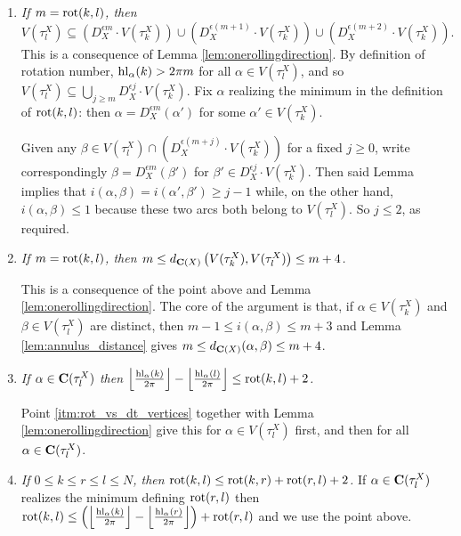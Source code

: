 \begin{rmk}
\begin{enumerate}
\item \label{itm:rot_vs_dt_vertices} \textit{If $m=\mathrm{rot}(k,l)$, then
$$V(\tau_l^X)\subseteq \left(D_X^{\epsilon m}\cdot V(\tau_k^X)\right)\cup \left(D_X^{\epsilon(m+1)}\cdot V(\tau_k^X)\right)\cup \left(D_X^{\epsilon(m+2)}\cdot V(\tau_k^X)\right).$$}
This is a consequence of Lemma \ref{lem:onerollingdirection}. By definition of rotation number, $\mathrm{hl}_\alpha(k)>2\pi m$ for all $\alpha \in V(\tau_l^X)$, and so $V(\tau_l^X)\subseteq \bigcup_{j\geq m} D_X^{\epsilon j}\cdot V(\tau_k^X)$. Fix $\alpha$ realizing the minimum in the definition of $\mathrm{rot}(k,l)$: then $\alpha= D_X^{\epsilon m}(\alpha')$ for some $\alpha'\in V(\tau_k^X)$.

Given any $\beta\in V(\tau_l^X)\cap \left(D_X^{\epsilon(m+j)}\cdot V(\tau_k^X)\right)$ for a fixed $j\geq 0$, write correspondingly $\beta=D_X^{\epsilon m}(\beta')$ for $\beta'\in D_X^{\epsilon j}\cdot V(\tau_k^X)$. Then said Lemma implies that $i(\alpha,\beta)=i(\alpha',\beta')\geq j-1$ while, on the other hand, $i(\alpha,\beta)\leq 1$ because these two arcs both belong to $V(\tau_l^X)$. So $j\leq 2$, as required.

\item \label{itm:rot_vs_dist}\textit{If $m=\mathrm{rot}(k,l)$, then $m\leq d_{\mathbf C(X)}\left(V(\tau_k^X),V(\tau_l^X)\right)\leq m+4$.}

This is a consequence of the point above and Lemma \ref{lem:onerollingdirection}. The core of the argument is that, if $\alpha\in V(\tau_k^X)$ and $\beta\in V(\tau_l^X)$ are distinct, then $m-1\leq i(\alpha,\beta)\leq m+3$ and Lemma \ref{lem:annulus_distance} gives $m\leq d_{\mathbf C(X)}(\alpha,\beta)\leq m+4$. 

\item \textit{If $\alpha\in\mathbf C(\tau_l^X)$ then $\left\lfloor \frac{\mathrm{hl}_\alpha(k)}{2\pi}\right\rfloor-\left\lfloor \frac{\mathrm{hl}_\alpha(l)}{2\pi}\right\rfloor\leq  \mathrm{rot}(k,l)+2$.}

Point \ref{itm:rot_vs_dt_vertices} together with Lemma \ref{lem:onerollingdirection} give this for $\alpha\in V(\tau_l^X)$ first, and then for all $\alpha\in\mathbf C(\tau_l^X)$.

\item \label{itm:concatrot_above} \textit{If $0\leq k\leq r\leq l\leq N$, then $\mathrm{rot}(k,l)\leq \mathrm{rot}(k,r)+\mathrm{rot}(r,l)+2$.}
If $\alpha\in \mathbf C(\tau_l^X)$ realizes the minimum defining $\mathrm{rot}(r,l)$ then
$\mathrm{rot}(k,l)\leq \left(\left\lfloor \frac{\mathrm{hl}_\alpha(k)}{2\pi}\right\rfloor-\left\lfloor \frac{\mathrm{hl}_\alpha(r)}{2\pi}\right\rfloor\right) + \mathrm{rot}(r,l)$
and we use the point above.


\end{enumerate}
\end{rmk}
